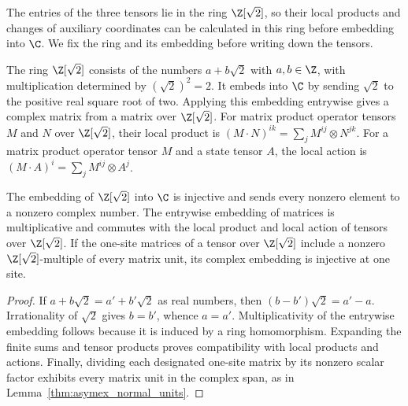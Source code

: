 The entries of the three tensors lie in the ring $\Z[\sqrt2]$, so their
local products and changes of auxiliary coordinates can be calculated in
this ring before embedding into $\C$. We fix the ring and its embedding
before writing down the tensors.

\begin{definition}%
    \label{def:asymex_zsqrt2_ring}
    \leanok
    The ring $\Z[\sqrt2]$ consists of the numbers $a+b\sqrt2$ with
    $a,b\in\Z$, with multiplication determined by $(\sqrt2)^2=2$.
    It embeds into $\C$ by sending $\sqrt2$ to the positive real square
    root of two. Applying this embedding entrywise gives a complex matrix
    from a matrix over $\Z[\sqrt2]$. For matrix product operator tensors
    $M$ and $N$ over $\Z[\sqrt2]$, their local product is
    $(M\mathbin{\cdot}N)^{ik}=\sum_jM^{ij}\otimes N^{jk}$.
    For a matrix product operator tensor $M$ and a state tensor $A$,
    the local action is $(M\cdot A)^i=\sum_jM^{ij}\otimes A^j$.
\end{definition}

\begin{lemma}%
    \label{thm:asymex_zsqrt2_ring}
    \leanok
    The embedding of $\Z[\sqrt2]$ into $\C$ is injective and sends every
    nonzero element to a nonzero complex number. The entrywise embedding
    of matrices is multiplicative and commutes with the local product
    and local action of tensors over $\Z[\sqrt2]$.
    If the one-site matrices of a tensor over $\Z[\sqrt2]$ include a
    nonzero $\Z[\sqrt2]$-multiple of every matrix unit, its complex
    embedding is injective at one site.
\end{lemma}

\begin{proof}
    \leanok
    If $a+b\sqrt2=a'+b'\sqrt2$ as real numbers, then
    $(b-b')\sqrt2=a'-a$. Irrationality of $\sqrt2$ gives $b=b'$,
    whence $a=a'$. Multiplicativity of the entrywise embedding follows
    because it is induced by a ring homomorphism. Expanding the finite
    sums and tensor products proves compatibility with local products
    and actions. Finally, dividing each designated one-site matrix by
    its nonzero scalar factor exhibits every matrix unit in the complex
    span, as in Lemma~\ref{thm:asymex_normal_units}.
\end{proof}

